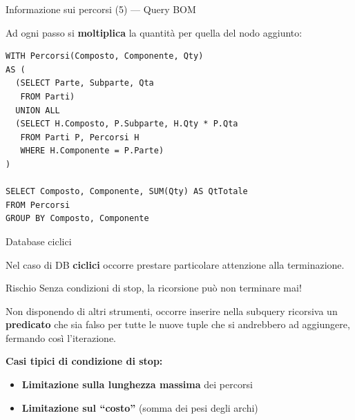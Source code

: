 \documentclass[aspectratio=169]{beamer}
\begin{document}
\begin{frame}[fragile]{Informazione sui percorsi (5) — Query BOM}

Ad ogni passo si \textbf{moltiplica} la quantità per quella del nodo aggiunto:

\begin{lstlisting}
WITH Percorsi(Composto, Componente, Qty)
AS (
  (SELECT Parte, Subparte, Qta
   FROM Parti)
  UNION ALL
  (SELECT H.Composto, P.Subparte, H.Qty * P.Qta
   FROM Parti P, Percorsi H
   WHERE H.Componente = P.Parte)
)

SELECT Composto, Componente, SUM(Qty) AS QtTotale
FROM Percorsi
GROUP BY Composto, Componente
\end{lstlisting}

\end{frame}

\begin{frame}{Database ciclici}

Nel caso di DB \textbf{ciclici} occorre prestare particolare attenzione alla terminazione.

\begin{alertblock}{Rischio}
Senza condizioni di stop, la ricorsione può non terminare mai!
\end{alertblock}

\vspace{8pt}
Non disponendo di altri strumenti, occorre inserire nella subquery ricorsiva un \textbf{predicato} che sia falso per tutte le nuove tuple che si andrebbero ad aggiungere, fermando così l'iterazione.

\vspace{8pt}
\textbf{Casi tipici di condizione di stop:}
\begin{itemize}
  \item \textbf{Limitazione sulla lunghezza massima} dei percorsi
  \item \textbf{Limitazione sul ``costo''} (somma dei pesi degli archi)
\end{itemize}

\end{frame}
\end{document}
